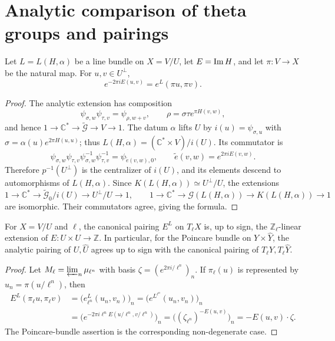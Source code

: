 
\section{Analytic comparison of theta groups and pairings}
\label{mumford-IV24-analytic-comparison-source}

\begin{theorem}
\label{mumford-thm-analytic-theta-commutator}
Let $L=L(H,\alpha)$ be a line bundle on $X=V/U$, let $E={\rm Im}\,H$, and
let $\pi:V\to X$ be the natural map. For $u,v\in U^\perp$,
\[
 e^{-2\pi iE(u,v)}=e^L(\pi u,\pi v).
\]
\end{theorem}
\begin{proof}
The analytic extension has composition
\[
 \psi_{\sigma,w}\psi_{\tau,v}=\psi_{\rho,w+v},
 \qquad \rho=\sigma\tau e^{\pi H(v,w)},
\]
and hence
$1\to\mathbb C^*\to\widetilde{\mathcal G}\to V\to1$.
The datum $\alpha$ lifts $U$ by
$i(u)=\psi_{\sigma,u}$ with $\sigma=\alpha(u)e^{2\pi H(u,u)}$; thus
$L(H,\alpha)=(\mathbb C^*\times V)/i(U)$. Its commutator is
\[
 \psi_{\sigma,w}\psi_{\tau,v}\psi_{\sigma,w}^{-1}\psi_{\tau,v}^{-1}
 =\psi_{\widetilde e(v,w),0},
 \qquad \widetilde e(v,w)=e^{2\pi iE(v,w)}.
\]
Therefore $p^{-1}(U^\perp)$ is the centralizer of $i(U)$, and its elements
descend to automorphisms of $L(H,\alpha)$. Since
$K(L(H,\alpha))\simeq U^\perp/U$, the extensions
\[
1\to\mathbb C^*\to\widetilde{\mathcal G}_0/i(U)\to U^\perp/U\to1,
\qquad
1\to\mathbb C^*\to\mathcal G(L(H,\alpha))\to K(L(H,\alpha))\to1
\]
are isomorphic. Their commutators agree, giving the formula.
\end{proof}

\begin{proposition}
\label{mumford-prop-analytic-ladic-pairing}
For $X=V/U$ and $\ell$, the canonical pairing $E^L$ on $T_\ell X$ is, up to
sign, the $\mathbb Z_\ell$-linear extension of $E:U\times U\to\mathbb Z$.
In particular, for the Poincare bundle on $Y\times\widehat Y$, the analytic
pairing of $U,\widehat U$ agrees up to sign with the canonical pairing of
$T_\ell Y,T_\ell\widehat Y$.
\end{proposition}
\begin{proof}
Let $M_\ell=\varprojlim_n\mu_{\ell^n}$ with basis
$\zeta=(e^{2\pi i/\ell^n})_n$. If $\pi_\ell(u)$ is represented by
$u_n=\pi(u/\ell^n)$, then
\[
\begin{aligned}
 E^L(\pi_\ell u,\pi_\ell v)
 &=\bigl(e_{\ell^n}^L(u_n,v_n)\bigr)_n
 =\bigl(e^{L^{\ell^n}}(u_n,v_n)\bigr)_n\\
 &=\bigl(e^{-2\pi i\ell^nE(u/\ell^n,v/\ell^n)}\bigr)_n
 =\bigl((\zeta_{\ell^n})^{-E(u,v)}\bigr)_n
 =-E(u,v)\cdot\zeta.
\end{aligned}
\]
The Poincare-bundle assertion is the corresponding non-degenerate case.
\end{proof}

